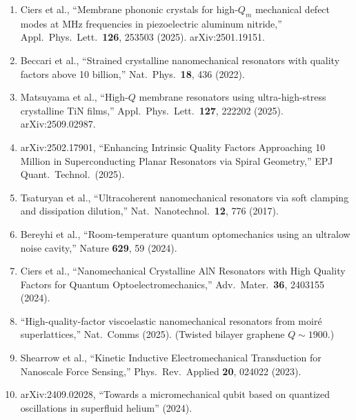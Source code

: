 \documentclass[11pt]{article}
\theoremstyle{remark}
\begin{document}
\begin{enumerate}[nosep]
  \item Ciers et al., ``Membrane phononic crystals for high-$Q_m$
    mechanical defect modes at MHz frequencies in piezoelectric
    aluminum nitride,''
    Appl.\ Phys.\ Lett.\ \textbf{126}, 253503 (2025).
    arXiv:2501.19151.
  \item Beccari et al., ``Strained crystalline nanomechanical resonators
    with quality factors above 10 billion,''
    Nat.\ Phys.\ \textbf{18}, 436 (2022).
  \item Matsuyama et al., ``High-$Q$ membrane resonators using
    ultra-high-stress crystalline TiN films,''
    Appl.\ Phys.\ Lett.\ \textbf{127}, 222202 (2025).
    arXiv:2509.02987.
  \item arXiv:2502.17901, ``Enhancing Intrinsic Quality Factors
    Approaching 10 Million in Superconducting Planar Resonators
    via Spiral Geometry,'' EPJ Quant.\ Technol.\ (2025).
  \item Tsaturyan et al., ``Ultracoherent nanomechanical resonators
    via soft clamping and dissipation dilution,''
    Nat.\ Nanotechnol.\ \textbf{12}, 776 (2017).
  \item Bereyhi et al., ``Room-temperature quantum optomechanics using
    an ultralow noise cavity,''
    Nature \textbf{629}, 59 (2024).
  \item Ciers et al., ``Nanomechanical Crystalline AlN Resonators with
    High Quality Factors for Quantum Optoelectromechanics,''
    Adv.\ Mater.\ \textbf{36}, 2403155 (2024).
  \item ``High-quality-factor viscoelastic nanomechanical resonators
    from moir\'e superlattices,''
    Nat.\ Comms (2025). (Twisted bilayer graphene $Q \sim 1900$.)
  \item Shearrow et al., ``Kinetic Inductive Electromechanical
    Transduction for Nanoscale Force Sensing,''
    Phys.\ Rev.\ Applied \textbf{20}, 024022 (2023).
  \item arXiv:2409.02028, ``Towards a micromechanical qubit based on
    quantized oscillations in superfluid helium'' (2024).
\end{enumerate}
\end{document}
